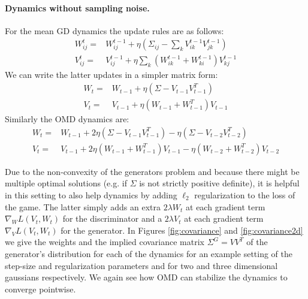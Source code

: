\paragraph{Dynamics without sampling noise.} For the mean GD dynamics the update rules are as follows:
\begin{equation}
\begin{aligned}
W_{ij}^t =& W_{ij}^{t-1} + \eta \left(\Sigma_{ij} - \sum_{k} V_{ik}^{t-1} V_{jk}^{t-1}\right) \\
V_{ij}^t =& V_{ij}^{t-1} + \eta \sum_{k} \left(W_{ik}^{t-1} + W_{ki}^{t-1}\right) V_{kj}^{t-1} 
\end{aligned}
\end{equation}
We can write the latter updates in a simpler matrix form:
\begin{equation}
\begin{aligned}
W_t =& W_{t-1} + \eta \left(\Sigma - V_{t-1} V_{t-1}^T\right)\\
V_t =& V_{t-1} + \eta (W_{t-1} + W_{t-1}^T) V_{t-1}
\end{aligned}\tag{GD for Covariance}
\end{equation}
Similarly the OMD dynamics are:
\begin{equation}
\begin{aligned}
W_t =& W_{t-1} + 2\eta \left(\Sigma - V_{t-1} V_{t-1}^T\right) - \eta \left(\Sigma - V_{t-2} V_{t-2}^T\right)\\
V_t =& V_{t-1} + 2\eta (W_{t-1} + W_{t-1}^T) V_{t-1} - \eta (W_{t-2} + W_{t-2}^T) V_{t-2}
\end{aligned}\tag{OMD for Covariance}
\end{equation}

Due to the non-convexity of the generators problem and because there might be multiple optimal solutions (e.g. if $\Sigma$ is not strictly positive definite), it is helpful in this setting to also help dynamics by adding $\ell_2$ regularization to the loss of the game. The latter simply adds an extra $2\lambda W_{t}$ at each gradient term $\nabla_W L(V_t, W_t)$ for the discriminator and a $2\lambda V_{t}$ at each gradient term $\nabla_{V} L(V_t, W_t)$ for the generator. In Figures \ref{fig:covariance} and \ref{fig:covariance2d} we give the weights and the implied covariance matrix $\Sigma^G=VV^T$ of the generator's distribution for each of the dynamics for an example setting of the step-size and regularization parameters and for two and three dimensional gaussians respectively. We again see how OMD can stabilize the dynamics to converge pointwise.

